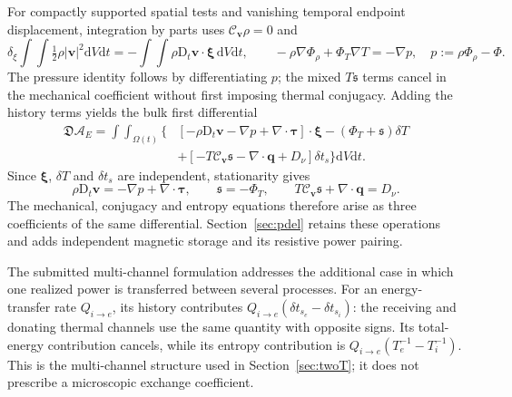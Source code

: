 \documentclass[11pt,a4paper]{article}
\theoremstyle{remark}\newtheorem{remark}{Remark}
\numberwithin{equation}{section}
\newcommand{\dd}{\mathrm{d}}
\newcommand{\vv}{\boldsymbol v}
\newcommand{\xii}{\boldsymbol\xi}
\newcommand{\ttau}{\boldsymbol\tau}
\newcommand{\qv}{\boldsymbol q}
\newcommand{\grad}{\nabla}
\newcommand{\diver}{\nabla\!\cdot}
\newcommand{\Dt}{\mathrm D_t}
\newcommand{\Cv}{\mathcal C_{\vv}}
\newcommand{\st}{\mathfrak s}
\begin{document}
For compactly supported spatial tests and vanishing temporal endpoint displacement, integration by parts uses $\Cv\rho=0$ and
\[
\delta_\xi\!\int\!\int\tfrac12\rho|\vv|^2\dd V\dd t
=-\int\!\int\rho\Dt\vv\cdot\xii\,\dd V\dd t,
\qquad
-\rho\grad\Phi_\rho+\Phi_T\grad T=-\grad p,
\quad p:=\rho\Phi_\rho-\Phi.
\]
The pressure identity follows by differentiating $p$; the mixed $T\st$ terms cancel in the mechanical coefficient without first imposing thermal conjugacy. Adding the history terms yields the bulk first differential
\begin{equation}
\begin{aligned}
\mathfrak D\mathscr A_E=\int\!\int_{\Omega(t)}\Big\{&
[-\rho\Dt\vv-\grad p+\diver\ttau]\cdot\xii
-(\Phi_T+\st)\delta T\\
&+[-T\Cv\st-\diver\qv+D_\nu]\delta t_s\Big\}\dd V\dd t.
\end{aligned}
\label{eq:revieweulerfirstvariation}
\end{equation}
Since $\xii$, $\delta T$ and $\delta t_s$ are independent, stationarity gives
\begin{equation}
\rho\Dt\vv=-\grad p+\diver\ttau,\qquad
\st=-\Phi_T,\qquad
T\Cv\st+\diver\qv=D_\nu.
\label{eq:revieweulerbalances}
\end{equation}
The mechanical, conjugacy and entropy equations therefore arise as three coefficients of the same differential. Section~\ref{sec:pdel} retains these operations and adds independent magnetic storage and its resistive power pairing.

The submitted multi-channel formulation \citep{RenMultiChannel} addresses the additional case in which one realized power is transferred between several processes. For an energy-transfer rate $Q_{i\to e}$, its history contributes $Q_{i\to e}(\delta t_{s_e}-\delta t_{s_i})$: the receiving and donating thermal channels use the same quantity with opposite signs. Its total-energy contribution cancels, while its entropy contribution is $Q_{i\to e}(T_e^{-1}-T_i^{-1})$. This is the multi-channel structure used in Section~\ref{sec:twoT}; it does not prescribe a microscopic exchange coefficient.
\end{document}
